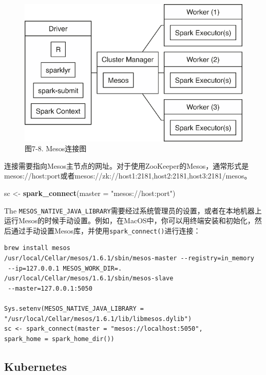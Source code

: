 \documentclass[
]{article}
\newenvironment{Shaded}{\begin{snugshade}}{\end{snugshade}}
\newcommand{\DataTypeTok}[1]{\textcolor[rgb]{0.13,0.29,0.53}{#1}}
\newcommand{\KeywordTok}[1]{\textcolor[rgb]{0.13,0.29,0.53}{\textbf{#1}}}
\newcommand{\NormalTok}[1]{#1}
\newcommand{\StringTok}[1]{\textcolor[rgb]{0.31,0.60,0.02}{#1}}
\begin{document}
\begin{figure}
\centering
\includegraphics{figures/7_8.png}
\caption{图7-8. Mesos连接图}
\end{figure}

连接需要指向Mesos主节点的网址。对于使用ZooKeeper的Mesos，通常形式是mesos://host:port或者mesos://zk://host1:2181,host2:2181,host3:2181/mesos。

\begin{Shaded}
\begin{Highlighting}[]
\NormalTok{sc <-}\StringTok{ }\KeywordTok{spark_connect}\NormalTok{(}\DataTypeTok{master =} \StringTok{"mesos://host:port"}\NormalTok{)}
\end{Highlighting}
\end{Shaded}

The
\texttt{MESOS\_NATIVE\_JAVA\_LIBRARY}需要经过系统管理员的设置，或者在本地机器上运行Mesos的时候手动设置。例如，在MacOS中，你可以用终端安装和初始化，然后通过手动设置Mesos库，并使用\texttt{spark\_connect()}进行连接：

\begin{verbatim}
brew install mesos
/usr/local/Cellar/mesos/1.6.1/sbin/mesos-master --registry=in_memory
 --ip=127.0.0.1 MESOS_WORK_DIR=. /usr/local/Cellar/mesos/1.6.1/sbin/mesos-slave
 --master=127.0.0.1:5050

Sys.setenv(MESOS_NATIVE_JAVA_LIBRARY =
"/usr/local/Cellar/mesos/1.6.1/lib/libmesos.dylib")
sc <- spark_connect(master = "mesos://localhost:5050",
spark_home = spark_home_dir())
\end{verbatim}

\hypertarget{kubernetes-1}{%
\subsection{Kubernetes}\label{kubernetes-1}}
\end{document}
